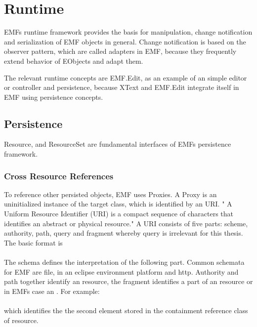 \section{Runtime}
EMFs runtime framework provides the basis for manipulation, change notification and serialization of EMF objects in general. \cite{EMF2nd} Change notification is based on the observer pattern, which are called adapters in EMF, because they frequently extend behavior of EObjects and adapt them.

The relevant runtime concepts are EMF.Edit, as an example of an simple editor or controller and persistence, because XText \cite{XTextMan} and EMF.Edit integrate itself in EMF using persistence concepts.

\subsection{Persistence}
Resource, and ResourceSet are fundamental interfaces of EMFs persistence framework.


\subsubsection{Cross Resource References}
To reference other persisted objects, EMF uses Proxies. A Proxy is an uninitialized instance of the target class, which is identified by an URI. " A Uniform Resource Identifier (URI) is a compact sequence of characters that identifies an abstract or physical resource." \cite{URI} A URI consists of five parts: scheme, authority, path, query and fragment whereby query is irrelevant for this thesis. The basic format is\\
 \\
The schema defines the interpretation of the following part. Common schemata for EMF are file, in an eclipse environment platform and http. Authority and path together identify an resource, the fragment identifies a part of an resource or in EMFs case an .
For example:\\
\\
which identifies the the second element stored in the containment reference class of  resource.


